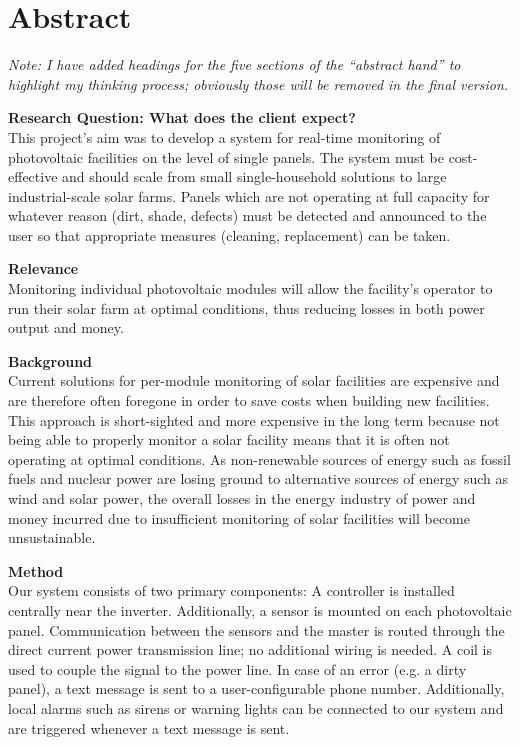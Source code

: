 \chapter*{Abstract}
\label{chap:abstract}

\emph{Note: I have  added headings  for the five  sections of  the ``abstract
hand'' to  highlight my thinking process;  obviously those will be  removed in
the final version.}

\vspace{2em}
\textbf{Research Question: What does the client expect?}\\
This  project's aim  was  to  develop a  system  for  real-time monitoring  of
photovoltaic  facilities on  the level  of single  panels. The system  must be
cost-effective and should scale from small single-household solutions to large
industrial-scale solar farms. Panels which are  not operating at full capacity
for whatever reason  (dirt, shade, defects) must be detected  and announced to
the user so that appropriate measures (cleaning, replacement) can be taken.

\textbf{Relevance}\\
Monitoring individual photovoltaic modules  will allow the facility's operator
to run  their solar farm at  optimal conditions, thus reducing  losses in both
power output and money.

\textbf{Background}\\
Current solutions for per-module monitoring  of solar facilities are expensive
and are  therefore often  foregone in  order to save  costs when  building new
facilities. This approach is short-sighted and more expensive in the long term
because not being able  to properly monitor a solar facility  means that it is
often not operating at optimal  conditions. As non-renewable sources of energy
such  as fossil  fuels  and nuclear  power are  losing  ground to  alternative
sources of  energy such  as wind and  solar power, the  overall losses  in the
energy industry of power and money  incurred due to insufficient monitoring of
solar facilities will become unsustainable.

\textbf{Method}\\
Our  system consists  of  two primary  components: A  controller is  installed
centrally  near  the  inverter. Additionally,  a sensor  is  mounted  on  each
photovoltaic  panel.  Communication  between  the sensors  and  the master  is
routed  through the  direct  current power  transmission  line; no  additional
wiring is needed. A  coil is used to  couple the signal to  the power line. In
case  of  an  error (e.g.  a  dirty  panel),  a  text  message is  sent  to  a
user-configurable phone  number. Additionally, local alarms such  as sirens or
warning lights  can be connected  to our system  and are triggered  whenever a
text message is sent.

